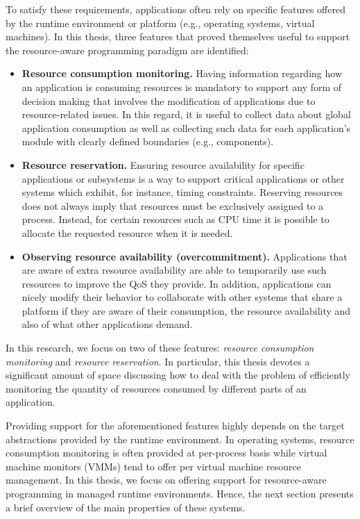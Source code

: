 To satisfy these requirements, applications often rely on specific features offered by the runtime environment or platform (e.g., operating systems, virtual machines).
In this thesis, three features that proved themselves useful to support the resource-aware programming paradigm are identified:

\begin{itemize}
\item \textbf{Resource consumption monitoring.}
Having information regarding how an application is consuming resources is mandatory to support any form of decision making that involves the modification of applications due to resource-related issues. 
In this regard, it is useful to collect data about global application consumption as well as collecting such data for each application's module with clearly defined boundaries (e.g., components).

\item \textbf{Resource reservation.}
Ensuring resource availability for specific applications or subsystems is a way to support critical applications or other systems which exhibit, for instance, timing constraints.
Reserving resources does not always imply that resources must be exclusively assigned to a process.
Instead, for certain resources such as CPU time it is possible to allocate the requested resource when it is needed.

\item \textbf{Observing resource availability (overcommitment).} 
Applications that are aware of extra resource availability are able to temporarily use such resources to improve the QoS they provide.
In addition, applications can nicely modify their behavior to collaborate with other systems that share a platform if they are aware of their consumption, the resource availability and also of what other applications demand.
\end{itemize}

In this research, we focus on two of these features: \textit{resource consumption monitoring} and \textit{resource reservation}.
In particular, this thesis devotes a significant amount of space discussing how to deal with the problem of efficiently monitoring the quantity of resources consumed by different parts of an application.

%
%

Providing support for the aforementioned features highly depends on the target abstractions provided by the runtime environment.
In operating systems, resource consumption monitoring is often provided at per-process basis while
virtual machine monitors (VMMs) tend to offer per virtual machine resource management.
In this thesis, we focus on offering support for resource-aware programming in managed runtime environments.
Hence, the next section presents a brief overview of the main properties of these systems. 

